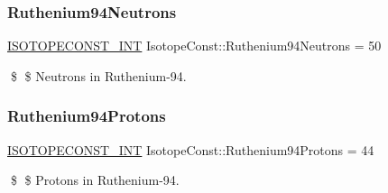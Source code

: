 \subsubsection{\texorpdfstring{Ruthenium94\+Neutrons}{Ruthenium94Neutrons}}
{\footnotesize\ttfamily \mbox{\hyperlink{group___isotope_const-_macros_ga5f18360b3e99483a35c32d789e62621c}{I\+S\+O\+T\+O\+P\+E\+C\+O\+N\+S\+T\+\_\+\+I\+NT}} Isotope\+Const\+::\+Ruthenium94\+Neutrons = 50}

\$ \$ Neutrons in Ruthenium-\/94. \mbox{\label{group___isotope_const-_ruthenium-_ru94_gac88748f72ea067de16aff702333e3f34}} 
\subsubsection{\texorpdfstring{Ruthenium94\+Protons}{Ruthenium94Protons}}
{\footnotesize\ttfamily \mbox{\hyperlink{group___isotope_const-_macros_ga5f18360b3e99483a35c32d789e62621c}{I\+S\+O\+T\+O\+P\+E\+C\+O\+N\+S\+T\+\_\+\+I\+NT}} Isotope\+Const\+::\+Ruthenium94\+Protons = 44}

\$ \$ Protons in Ruthenium-\/94. 